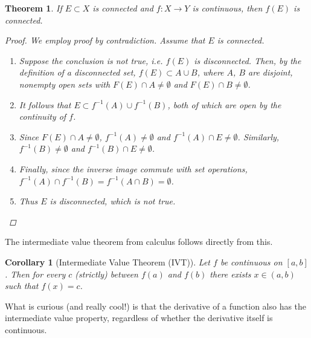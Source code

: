 \documentclass[12pt]{amsart}         %
\newtheorem{theorem}{Theorem}[section]
\newtheorem{corollary}{Corollary}[section]
\theoremstyle{remark}
\begin{document}
\begin{theorem}
If $E \subset X$ is connected and $f:X\rightarrow Y$ is continuous, then $f(E)$ is connected.
\begin{proof} We employ proof by contradiction. Assume that $E$ is connected.
\begin{enumerate}
    \item Suppose the conclusion is not true, i.e. $f(E)$ is disconnected. Then, by the definition of a disconnected set, $f(E) \subset A \cup B$, where $A$, $B$ are disjoint, nonempty open sets with $F(E) \cap A \neq \emptyset$ and $F(E) \cap B \neq \emptyset$. 
    \item It follows that $E \subset f^{-1}(A) \cup f^{-1}(B)$, both of which are open by the continuity of $f$.
    \item Since $F(E) \cap A \neq \emptyset$, $f^{-1}(A) \neq \emptyset$ and $f^{-1}(A) \cap E \neq \emptyset$. Similarly, $f^{-1}(B) \neq \emptyset$ and $f^{-1}(B) \cap E \neq \emptyset$.
    \item Finally, since the inverse image commute with set operations, $f^{-1}(A) \cap f^{-1}(B) = f^{-1}(A \cap B) = \emptyset$.
    \item Thus $E$ is disconnected, which is not true.
\end{enumerate}
\end{proof}
\end{theorem}

The intermediate value theorem from calculus follows directly from this.

\begin{corollary}[Intermediate Value Theorem (IVT)]Let $f$ be continuous on $[a, b]$. Then for every $c$ (strictly) between $f(a)$ and $f(b)$ there exists $x \in (a, b)$ such that $f(x) = c$.
\end{corollary}

What is curious (and really cool!) is that the derivative of a function also has the intermediate value property, regardless of whether the derivative itself is continuous.
\end{document}
